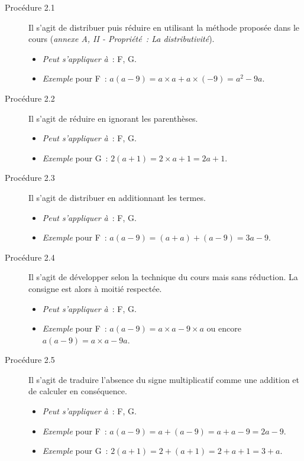 \documentclass{report}
\theoremstyle{definition}
\begin{document}
\begin{description}

\item[\textcolor{bpc}{Procédure 2.1}] Il s'agit de distribuer puis réduire en utilisant la méthode proposée dans le cours (\textit{annexe A, II - Propriété~: La distributivité}).
\begin{itemize}
\item \textit{Peut s'appliquer à}~: F, G.
\item \textit{Exemple} pour F~: $a(a-9)=a\times a + a\times (-9)=a^2-9a$.
\end{itemize}

\item[\textcolor{mpc}{Procédure 2.2}] Il s'agit de réduire en ignorant les parenthèses.
\begin{itemize}
\item \textit{Peut s'appliquer à}~: F, G.
\item \textit{Exemple} pour G~: $2(a+1)=2\times a +1 = 2a+1$.
\end{itemize}

\item[\textcolor{mpc}{Procédure 2.3}] Il s'agit de distribuer en additionnant les termes.
\begin{itemize}
\item \textit{Peut s'appliquer à}~: F, G.
\item \textit{Exemple} pour F~: $a(a-9)=(a+a)+(a-9)=3a-9$.
\end{itemize}

\item[\textcolor{mpc}{Procédure 2.4}] Il s'agit de développer selon la technique du cours mais sans réduction. La consigne est alors à moitié respectée.
\begin{itemize}
\item \textit{Peut s'appliquer à}~: F, G.
\item \textit{Exemple} pour F~: $a(a-9)=a\times a - 9\times a$ ou encore $a(a-9)=a\times a - 9a$.
\end{itemize}

\item[\textcolor{mpc}{Procédure 2.5}] Il s'agit de traduire l'absence du signe multiplicatif comme une addition et de calculer en conséquence.
\begin{itemize}
\item \textit{Peut s'appliquer à}~: F, G.
\item \textit{Exemple} pour F~: $a(a-9)=a+(a-9)=a+a-9=2a-9$.
\item \textit{Exemple} pour G~: $2(a+1)=2+(a+1)=2+a+1=3+a$.

\end{itemize}

\end{description}
\end{document}
